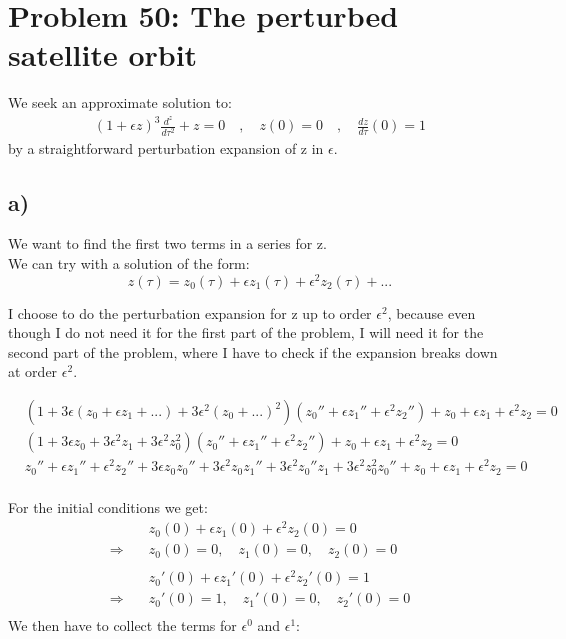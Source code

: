 \documentclass[a4paper,10pt]{article}
\begin{document}
\newpage

\section*{Problem 50: The perturbed satellite orbit}
We seek an approximate solution to:
\begin{align}
(1+\epsilon z)^3\frac{d^z}{d \tau^2} + z = 0 \quad , \quad z(0) = 0 \quad , \quad \frac{d z}{d \tau}(0) = 1
\end{align}
by a straightforward perturbation expansion of z in $\epsilon$.
\subsection*{a)}
We want to find the first two terms in a series for z.\\
We can try with a solution of the form: 
$$z(\tau) = z_0(\tau) + \epsilon z_1(\tau) + \epsilon^2 z_2(\tau) + ... $$

I choose to do the perturbation expansion for z up to order $\epsilon^2$, because even though I do not need it for the first part of the problem, I will need it for the second part of the problem, where I have to check if the expansion breaks down at order $\epsilon^2$.

\begin{align*}
&(1+3\epsilon(z_0 + \epsilon z_1+...)+3\epsilon^2(z_0+...)^2)(z_0''+\epsilon z_1'' + \epsilon^2 z_2'')+z_0 + \epsilon z_1 + \epsilon^2 z_2 = 0\\[2mm]
&(1+3\epsilon z_0 + 3 \epsilon^2 z_1 +3\epsilon^2 z_0^2)(z_0''+\epsilon z_1'' + \epsilon^2 z_2'')+z_0 + \epsilon z_1 + \epsilon^2 z_2 = 0\\[2mm]
&z_0'' + \epsilon z_1'' + \epsilon^2 z_2'' + 3 \epsilon z_0 z_0'' + 3 \epsilon^2 z_0 z_1'' + 3 \epsilon^2 z_0'' z_1 + 3 \epsilon^2 z_0^2 z_0'' + z_0 + \epsilon z_1 + \epsilon^2 z_2 = 0\\
\end{align*}

For the initial conditions we get:
\begin{align*}
&z_0(0) + \epsilon z_1(0) + \epsilon^2 z_2(0) = 0\\
\Rightarrow \quad &z_0(0) = 0,
\quad z_1(0) = 0,
\quad z_2(0) = 0\\\\
&z_0'(0) + \epsilon z_1'(0) + \epsilon^2 z_2'(0) = 1\\
\Rightarrow \quad &z_0'(0) = 1,
\quad z_1'(0) = 0,
\quad z_2'(0) = 0\\
\end{align*}
We then have to collect the terms for $\epsilon^0$ and $\epsilon^1$:
\end{document}
